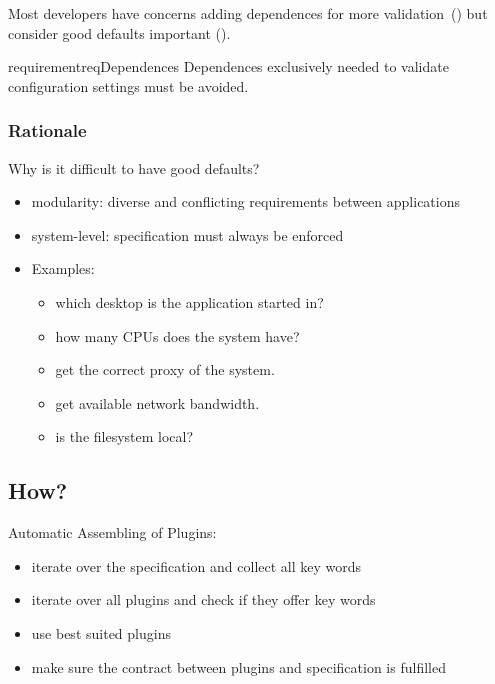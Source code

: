 \begin{frame}
	\begin{finding}
	Most developers have concerns adding dependences for more validation~() but consider good defaults important ().
	\end{finding}

	\begin{restatable}{requirement}{reqDependences}
	\label{req:dependences}
	Dependences exclusively needed to validate configuration settings must be avoided.
	\end{restatable}
\end{frame}

\begin{frame}
	\frametitle{Rationale}
	Why is it difficult to have good defaults?
	\begin{itemize}[<+->]
	\item modularity: diverse and conflicting requirements between applications %
	\item system-level: specification must always be enforced
	\item Examples:
	\begin{itemize}[<+-| alert@+>]
	\item which desktop is the application started in?
	\item how many CPUs does the system have?
	\item get the correct proxy of the system.
	\item get available network bandwidth.
	\item is the filesystem local?
	\end{itemize}
	\end{itemize}
\end{frame}

\subsection{How?}

\begin{frame}
	\Large
\end{frame}

\begin{frame}
	Automatic Assembling of Plugins:

	\begin{itemize}[<+->]
	\item iterate over the specification and collect all key words
	\item iterate over all plugins and check if they offer key words
	\item use best suited plugins
	\item make sure the contract between plugins and specification is fulfilled
	\end{itemize}
\end{frame}

